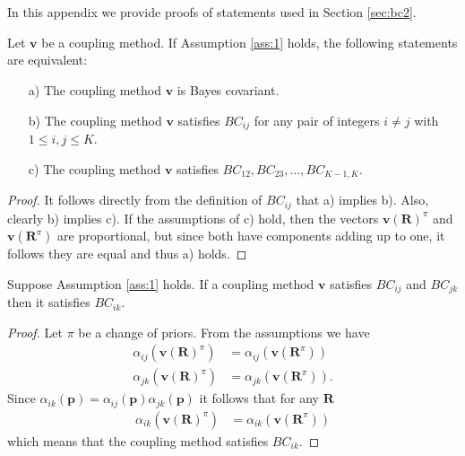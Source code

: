 \appendix

\section{}
\label{app:bc1}

In this appendix we provide proofs of statements used in Section \ref{sec:bc2}.

\begin{prop} \label{prop:bcprop}
	Let $\boldsymbol{v}$ be a coupling method. If Assumption \ref{ass:1} holds, the following statements are equivalent:
	\begin{itemize}
		\item[a)] The coupling method $\boldsymbol{v}$ is Bayes covariant.
		\item[b)] The coupling method $\boldsymbol{v}$ satisfies $BC_{ij}$ for any pair of integers  $i\not= j$ with $1\leq i,j \leq K$.
		\item[c)] The coupling method $\boldsymbol{v}$ satisfies $BC_{12}, BC_{23}, \ldots, BC_{K-1,K}$.
	\end{itemize}
\end{prop}
\begin{proof}
It follows directly from the definition of $BC_{ij}$ that a) implies b). Also, clearly b) implies c). If the assumptions of c) hold, then the vectors $\boldsymbol{v}(\boldsymbol{R})^\pi$ and $ \boldsymbol{v}(\boldsymbol{R}^\pi)$ are proportional, but since both have components adding up to one, it follows they are equal and thus a) holds.
\end{proof}

\begin{lem} \label{lem:transitivity}
	Suppose Assumption \ref{ass:1} holds. If a coupling method $\boldsymbol{v}$ satisfies $BC_{ij}$ and $BC_{jk}$ then it satisfies $BC_{ik}$.
\end{lem}
\begin{proof}
	Let $\pi$ be a change of priors. From the assumptions we have 
	\begin{align}
		\alpha_{ij}(\boldsymbol{v}(\boldsymbol{R})^\pi ) &= \alpha_{ij}(\boldsymbol{v}(\boldsymbol{R}^\pi) ) \\
		\alpha_{jk}(\boldsymbol{v}(\boldsymbol{R})^\pi ) &= \alpha_{jk}(\boldsymbol{v}(\boldsymbol{R}^\pi) ).
	\end{align}
	Since $\alpha_{ik}(\boldsymbol{p}) = \alpha_{ij}(\boldsymbol{p})  \alpha_{jk}(\boldsymbol{p})$ it follows that for any $\boldsymbol{R}$
	\begin{align}
		\alpha_{ik}(\boldsymbol{v}(\boldsymbol{R})^\pi ) &= \alpha_{ik}(\boldsymbol{v}(\boldsymbol{R}^\pi) )
	\end{align}
	which means that the coupling method satisfies $BC_{ik}$.
\end{proof}

